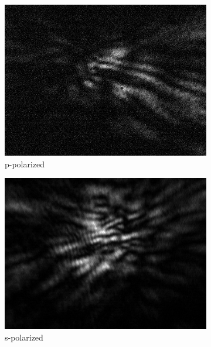 \begin{figure}[!h]
\centering
  \begin{subfigure}[b]{0.2\textwidth}
    \includegraphics[width=\textwidth]{diffraction_image/2015040117594700071-1}
    \caption{p-polarized}
  \end{subfigure}
  \begin{subfigure}[b]{0.2\textwidth}
    \includegraphics[width=\textwidth]{diffraction_image/2015040117594700071-2}
    \caption{s-polarized}
  \end{subfigure}
  \begin{subfigure}[b]{0.2\textwidth}

\end{subfigure}
\end{figure}
